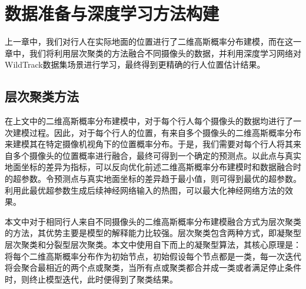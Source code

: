 
\chapter{数据准备与深度学习方法构建}

上一章中，我们对行人在实际地面的位置进行了二维高斯概率分布建模，而在这一章中，我们将利用层次聚类的方法融合不同摄像头的数据，并利用深度学习网络对WildTrack数据集场景进行学习，最终得到更精确的行人位置估计结果。

\section{层次聚类方法}

在上文中的二维高斯概率分布建模中，对于每个行人每个摄像头的数据均进行了一次建模过程。因此，对于每个行人的位置，有来自多个摄像头的二维高斯概率分布来建模其在特定摄像机视角下的位置概率分布。于是，我们需要对每个行人将其来自多个摄像头的位置概率进行融合，最终可得到一个确定的预测点。以此点与真实地面坐标的差异为指标，可以反向优化前述二维高斯概率分布建模时和数据融合时的超参数。令预测点与真实地面坐标的差异趋于最小值，则可得到最优的超参数。利用此最优超参数生成后续神经网络输入的热图，可以最大化神经网络方法的效果。

本文中对于相同行人来自不同摄像头的二维高斯概率分布建模融合方式为层次聚类的方法，其优势主要是模型的解释能力比较强。层次聚类包含两种方式，即凝聚型层次聚类和分裂型层次聚类。本文中使用自下而上的凝聚型算法，其核心原理是：将每个二维高斯概率分布作为初始节点，初始假设每个节点都是一类，每一次迭代将会聚合最相近的两个点或聚类，当所有点或聚类都合并成一类或者满足停止条件时，则终止模型迭代，此时便得到了聚类结果。

